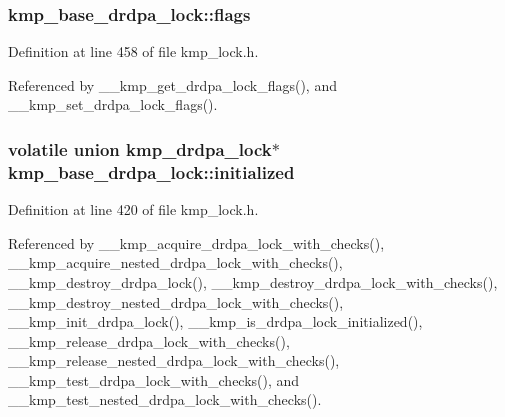 \hypertarget{structkmp__base__drdpa__lock_a9307a08687874c5ba8ad3ac355945ac7}{
\subsubsection[{flags}]{ kmp\-\_\-base\-\_\-drdpa\-\_\-lock\-::flags}}\label{structkmp__base__drdpa__lock_a9307a08687874c5ba8ad3ac355945ac7}


Definition at line 458 of file kmp\-\_\-lock.\-h.



Referenced by \-\_\-\-\_\-kmp\-\_\-get\-\_\-drdpa\-\_\-lock\-\_\-flags(), and \-\_\-\-\_\-kmp\-\_\-set\-\_\-drdpa\-\_\-lock\-\_\-flags().

\hypertarget{structkmp__base__drdpa__lock_a92a265553be821abfabdb1c68f70b70b}{
\subsubsection[{initialized}]{ volatile union {\bf kmp\-\_\-drdpa\-\_\-lock}$\ast$ kmp\-\_\-base\-\_\-drdpa\-\_\-lock\-::initialized}}\label{structkmp__base__drdpa__lock_a92a265553be821abfabdb1c68f70b70b}


Definition at line 420 of file kmp\-\_\-lock.\-h.



Referenced by \-\_\-\-\_\-kmp\-\_\-acquire\-\_\-drdpa\-\_\-lock\-\_\-with\-\_\-checks(), \-\_\-\-\_\-kmp\-\_\-acquire\-\_\-nested\-\_\-drdpa\-\_\-lock\-\_\-with\-\_\-checks(), \-\_\-\-\_\-kmp\-\_\-destroy\-\_\-drdpa\-\_\-lock(), \-\_\-\-\_\-kmp\-\_\-destroy\-\_\-drdpa\-\_\-lock\-\_\-with\-\_\-checks(), \-\_\-\-\_\-kmp\-\_\-destroy\-\_\-nested\-\_\-drdpa\-\_\-lock\-\_\-with\-\_\-checks(), \-\_\-\-\_\-kmp\-\_\-init\-\_\-drdpa\-\_\-lock(), \-\_\-\-\_\-kmp\-\_\-is\-\_\-drdpa\-\_\-lock\-\_\-initialized(), \-\_\-\-\_\-kmp\-\_\-release\-\_\-drdpa\-\_\-lock\-\_\-with\-\_\-checks(), \-\_\-\-\_\-kmp\-\_\-release\-\_\-nested\-\_\-drdpa\-\_\-lock\-\_\-with\-\_\-checks(), \-\_\-\-\_\-kmp\-\_\-test\-\_\-drdpa\-\_\-lock\-\_\-with\-\_\-checks(), and \-\_\-\-\_\-kmp\-\_\-test\-\_\-nested\-\_\-drdpa\-\_\-lock\-\_\-with\-\_\-checks().

